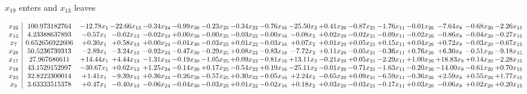 \documentclass[9pt]{article}
\begin{document}
 $ x_{19} $ enters and $ x_{13} $ leaves 

 \[\begin{array}{c| c c@{\hskip 2pt} c@{\hskip 2pt} c@{\hskip 2pt} c@{\hskip 2pt} c@{\hskip 2pt} c@{\hskip 2pt} c@{\hskip 2pt} c@{\hskip 2pt} c@{\hskip 2pt} c@{\hskip 2pt} c@{\hskip 2pt} c@{\hskip 2pt} c@{\hskip 2pt} c@{\hskip 2pt} c@{\hskip 2pt} }
 x_{32}   &  100.973182764 & -12.78 x_{1} & -22.66 x_{13} & -0.34 x_{24} & -0.99 x_{30} & -0.23 x_{25} & -0.34 x_{22} & -0.76 x_{16} & -25.50 x_{2} & +  0.41 x_{29} & -0.87 x_{21} & -1.76 x_{11} & -0.01 x_{26} & -7.64 x_{8} & -0.68 x_{20} & -2.26 x_{15}\\
 x_{12}   &  4.23388637893 & -0.57 x_{1} & -0.62 x_{13} & -0.02 x_{24} & +  0.00 x_{30} & -0.00 x_{25} & -0.03 x_{22} & -0.00 x_{16} & -0.08 x_{2} & +  0.02 x_{29} & -0.02 x_{21} & -0.09 x_{11} & -0.02 x_{26} & -0.86 x_{8} & -0.04 x_{20} & -0.27 x_{15}\\
 x_{7}   &  0.652656922606 & +  0.30 x_{1} & +  0.58 x_{13} & +  0.00 x_{24} & -0.01 x_{30} & -0.03 x_{25} & +  0.01 x_{22} & -0.03 x_{16} & +  0.07 x_{2} & +  0.01 x_{29} & +  0.05 x_{21} & +  0.15 x_{11} & +  0.04 x_{26} & +  0.72 x_{8} & -0.03 x_{20} & -0.67 x_{15}\\
 x_{28}   &  50.5236739313 & -2.89 x_{1} & -3.24 x_{13} & -0.92 x_{24} & -0.47 x_{30} & -0.29 x_{25} & +  0.08 x_{22} & -0.83 x_{16} & -7.72 x_{2} & +  0.11 x_{29} & -0.05 x_{21} & -0.36 x_{11} & +  0.76 x_{26} & +  6.30 x_{8} & -0.51 x_{20} & -9.18 x_{15}\\
 x_{17}   &  27.967686611 & + 14.44 x_{1} & +  4.44 x_{13} & -1.31 x_{24} & -0.19 x_{30} & -1.05 x_{25} & +  0.09 x_{22} & -0.81 x_{16} & + 13.11 x_{2} & -0.21 x_{29} & +  0.05 x_{21} & -2.29 x_{11} & +  1.00 x_{26} & + 18.83 x_{8} & +  0.14 x_{20} & -2.28 x_{15}\\
 x_{18}   &  43.1529152997 & -30.67 x_{1} & +  0.62 x_{13} & +  1.25 x_{24} & -0.14 x_{30} & +  0.17 x_{25} & -0.54 x_{22} & +  0.19 x_{16} & -25.11 x_{2} & -0.01 x_{29} & -0.71 x_{21} & -1.63 x_{11} & -0.20 x_{26} & -14.00 x_{8} & -0.61 x_{20} & +  0.70 x_{15}\\
 x_{23}   &  32.8222300014 & +  1.41 x_{1} & -9.39 x_{13} & +  0.36 x_{24} & -0.26 x_{30} & -0.57 x_{25} & +  0.30 x_{22} & -0.05 x_{16} & +  2.24 x_{2} & -0.65 x_{29} & +  0.09 x_{21} & -6.59 x_{11} & -0.36 x_{26} & +  2.59 x_{8} & +  0.55 x_{20} & +  1.77 x_{15}\\
 x_{9}   &  3.63333515378 & +  0.47 x_{1} & -0.40 x_{13} & -0.06 x_{24} & -0.04 x_{30} & -0.03 x_{25} & +  0.01 x_{22} & -0.02 x_{16} & +  0.18 x_{2} & +  0.03 x_{29} & -0.03 x_{21} & -0.17 x_{11} & +  0.03 x_{26} & -0.06 x_{8} & +  0.02 x_{20} & +  0.20 x_{15}\\

\end{array}\]
\end{document}
